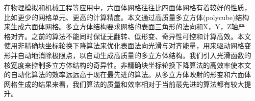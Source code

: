 \begin{cnabstract}
在物理模拟和机械工程等应用中，六面体网格往往比四面体网格有着较好的性质，比如更少的网格单元、更高的计算精度。本文通过高质量多立方体(polycube)结构来生成六面体网格。多立方体结构要求网格的表面三角形的法向和X，Y，Z轴严格对齐。之前的算法不能同时保证无翻转、低形变、奇异性可控和计算高效。本文使用非精确块坐标轮换下降算法来优化表面法向光滑与对齐能量，用来驱动网格变形并自动地消除极限点，以自动生成高质量的多立方体结构。我们引入光滑函数的核宽度来控制多立方体结构的奇异性。非精确块坐标轮换下降算法的高效率使本文的自动化算法的效率远远高于现在最先进的算法。从多立方体映射的形变和六面体网格生成的结果来看，我们算法的质量和效率相对于当前最先进的算法都有较大提升。


\end{cnabstract}

